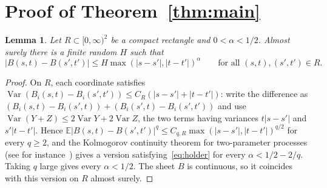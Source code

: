 \documentclass[11pt]{amsart}
\newtheorem{lemma}[theorem]{Lemma}
\theoremstyle{remark}
\newcommand{\E}{\mathbb{E}}
\newcommand{\Var}{\operatorname{Var}}
\begin{document}
\section{Proof of Theorem~\ref{thm:main}}\label{sec:proof}

\begin{lemma}\label{lem:holder}
Let $R\subset[0,\infty)^2$ be a compact rectangle and $0<\alpha<1/2$. Almost surely there is a finite random $H$ such
that
\begin{equation}\label{eq:holder}
|B(s,t)-B(s',t')|\le H\max(|s-s'|,|t-t'|)^\alpha\qquad\text{for all }(s,t),(s',t')\in R.
\end{equation}
\end{lemma}

\begin{proof}
On $R$, each coordinate satisfies $\Var(B_i(s,t)-B_i(s',t'))\le C_R(|s-s'|+|t-t'|)$: write the difference as
$(B_i(s,t)-B_i(s',t))+(B_i(s',t)-B_i(s',t'))$ and use $\Var(Y+Z)\le2\Var Y+2\Var Z$, the two terms having variances
$t|s-s'|$ and $s'|t-t'|$. Hence $\E|B(s,t)-B(s',t')|^q\le C_{q,R}\max(|s-s'|,|t-t'|)^{q/2}$ for every $q\ge2$, and the
Kolmogorov continuity theorem for two-parameter processes (see for instance~\cite{Kho02}) gives a version
satisfying~\eqref{eq:holder} for every $\alpha<1/2-2/q$. Taking $q$ large gives every $\alpha<1/2$. The sheet $B$ is
continuous, so it coincides with this version on $R$ almost surely.
\end{proof}
\end{document}
